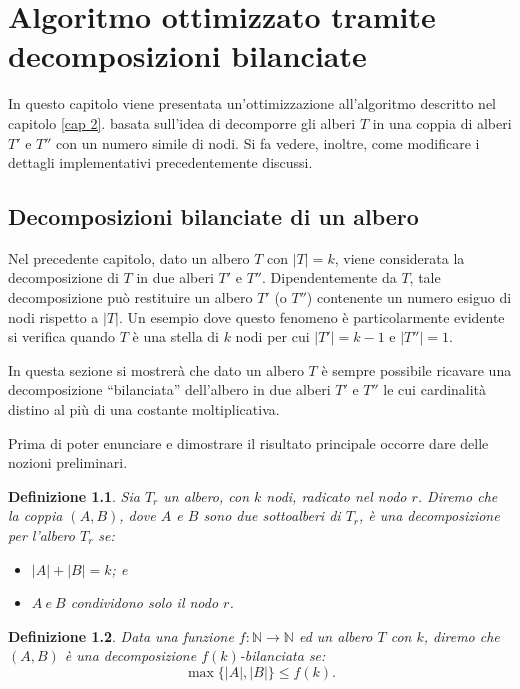 \chapter{Algoritmo ottimizzato tramite decomposizioni bilanciate}
\label{cap:3}
In questo capitolo viene presentata un'ottimizzazione all'algoritmo descritto nel capitolo \ref{cap 2}. 
basata sull'idea di decomporre gli alberi $T$ in una coppia di alberi $T'$ e $T''$ con un numero simile di nodi.
Si fa vedere, inoltre, come modificare i dettagli implementativi precedentemente discussi.

\section{Decomposizioni bilanciate di un albero}
\label{cap:3 par:1}
Nel precedente capitolo, dato un albero $ T $ con $|T|=k$, viene considerata la decomposizione di $T$ in due alberi $ T' $ e $ T''$. 
Dipendentemente da $T$, tale decomposizione può restituire un albero $T'$ (o $T''$) contenente un numero esiguo di nodi rispetto a $|T|$.
Un esempio dove questo fenomeno è particolarmente evidente si verifica quando $T$ è una stella di $k$ nodi per cui $|T'|=k-1$ e $|T''|=1$.

In questa sezione si mostrerà che dato un albero $T$ \`e sempre possibile ricavare una decomposizione ``bilanciata'' dell'albero  in due alberi $ T' $ e $ T'' $ le cui cardinalit\`a distino al più di una costante moltiplicativa.

Prima di poter enunciare e dimostrare il risultato principale occorre dare delle nozioni preliminari.

\newtheorem{definizione}{Definizione}[section]

\begin{definizione}
	\label{definizioneDeco} 
Sia $T_r$ un albero, con $k$ nodi, radicato nel nodo $r$.
Diremo che la coppia $(A,B)$, dove  $A$ e $B$ sono due sottoalberi di $T_r$, \`e una decomposizione per l'albero $ T_r $ se:
\begin{itemize}
	\item $| A | + | B | = k$; e
\item $A \ e \  B $ condividono solo il nodo $ r $.
\end{itemize}
\end{definizione}


\begin{definizione}
\label{lemmaDeco}
Data una funzione $f : \mathbb{N} \to \mathbb{N}$ ed un albero $ T $ con $ k $, diremo che $ (A,B) $ \`e una decomposizione $ f(k) $-bilanciata se:
\begin{equation*}
	\max{ \{|A| , |B| \} }  \le  f(k).
\end{equation*}
\end{definizione}\mbox{}


